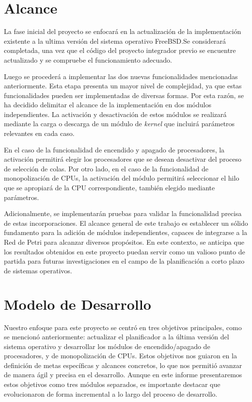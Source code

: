 \section{Alcance}

La fase inicial del proyecto se enfocará en la actualización de la implementación existente a la ultima versión del sistema operativo FreeBSD.\@ Se considerará completada, una vez que el código del proyecto integrador previo se encuentre actualizado y se compruebe el funcionamiento adecuado.\par

Luego se procederá a implementar las dos nuevas funcionalidades mencionadas anteriormente. Esta etapa presenta un mayor nivel de complejidad, ya que estas funcionalidades pueden ser implementadas de diversas formas. Por esta razón, se ha decidido delimitar el alcance de la implementación en dos módulos independientes. La activación y desactivación de estos módulos se realizará mediante la carga o descarga de un módulo de \textit{kernel} que incluirá parámetros relevantes en cada caso.\par

En el caso de la funcionalidad de encendido y apagado de procesadores, la activación permitirá elegir los procesadores que se desean desactivar del proceso de selección de colas. Por otro lado, en el caso de la funcionalidad de monopolización de CPUs, la activación del módulo permitirá seleccionar el hilo que se apropiará de la CPU correspondiente, también elegido mediante parámetros.\par

Adicionalmente, se implementarán pruebas para validar la funcionalidad precisa de estas incorporaciones. El alcance general de este trabajo es establecer un sólido fundamento para la adición de módulos independientes, capaces de integrarse a la Red de Petri para alcanzar diversos propósitos. En este contexto, se anticipa que los resultados obtenidos en este proyecto puedan servir como un valioso punto de partida para futuras investigaciones en el campo de la planificación a corto plazo de sistemas operativos.\par

\section{Modelo de Desarrollo}

Nuestro enfoque para este proyecto se centró en tres objetivos principales, como se mencionó anteriormente: actualizar el planificador a la última versión del sistema operativo y desarrollar los módulos de encendido/apagado de procesadores, y de monopolización de CPUs. Estos objetivos nos guiaron en la definición de metas específicas y alcances concretos, lo que nos permitió avanzar de manera ágil y precisa en el desarrollo. Aunque en este informe presentaremos estos objetivos como tres módulos separados, es importante destacar que evolucionaron de forma incremental a lo largo del proceso de desarrollo.

